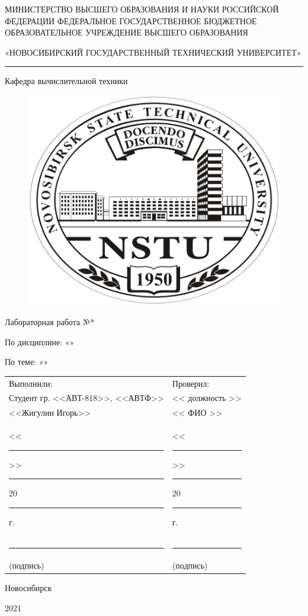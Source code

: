 \thispagestyle{empty}
\begin{center}

МИНИСТЕРСТВО ВЫСШЕГО ОБРАЗОВАНИЯ И НАУКИ РОССИЙСКОЙ ФЕДЕРАЦИИ
ФЕДЕРАЛЬНОЕ ГОСУДАРСТВЕННОЕ БЮДЖЕТНОЕ
ОБРАЗОВАТЕЛЬНОЕ УЧРЕЖДЕНИЕ
ВЫСШЕГО ОБРАЗОВАНИЯ

«НОВОСИБИРСКИЙ ГОСУДАРСТВЕННЫЙ ТЕХНИЧЕСКИЙ УНИВЕРСИТЕТ»

\noindent\rule{\textwidth}{0.4pt}

Кафедра вычислительной техники

\begin{figure}[H]
	\centering
	\includegraphics{title/logo.jpeg}
\end{figure}

Лабораторная работа №*

По дисциплине: «»

По теме: «»

\end{center}

\noindent\begin{tabular}{p{}p{}}
	Выполнили: & Проверил: \\
	Студент гр. <<АВТ-818>>, <<АВТФ>> & << должность >>\\
	<<Жигулин Игорь>> & << ФИО >> \\
	<<\rule{1.5em}{0.4pt}>> \rule{5em}{0.4pt} 20\rule{1.5em}{0.4pt}г. & <<\rule{1.5em}{0.4pt}>> \rule{5em}{0.4pt} 20\rule{1.5em}{0.4pt}г.\\
	\rule{7.5em}{0.4pt} & \rule{7.5em}{0.4pt} \\
	\hspace{1.5em}(подпись) & \hspace{1.5em}(подпись)
\end{tabular}


\begin{center}

\vspace{2.5cm}

Новосибирск

2021
\end{center}
